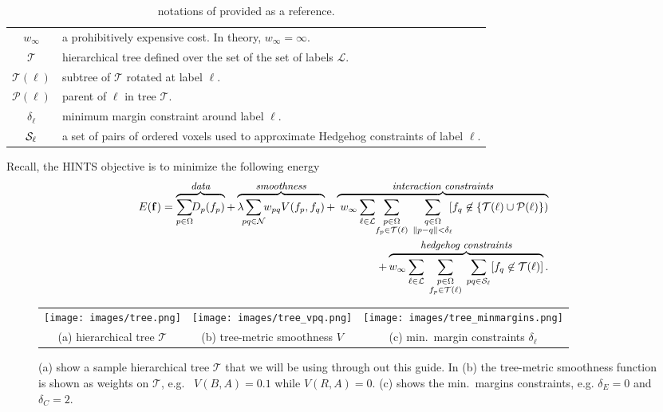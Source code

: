 \documentclass[12pt,letterpaper]{article}
\def\Tree{\mathcal{T}}
\def\labelvars{\mathbf{f}}
\def\labelvar{f}
\def\pixelset{\Omega}
\def\neighbset{\mathcal{N}}
\def\labelset{\mathcal{L}}
\def\Tree{\mathcal{T}}
\def\margins{\delta}
\def\unary{D}
\def\parent{\mathcal{P}}
\def\pairwise{V}
\begin{document}
\begin{table}[h]
\begin{tabular}{|c|p{14.5cm}|}
$w_\infty$ & a prohibitively expensive cost. In theory, $w_\infty=\infty$.\\
$\Tree$ & hierarchical tree defined over the set of the set of labels $\labelset.$\\
$\Tree(\ell)$ & subtree of $\Tree$ rotated at label $\ell$.\\
$\parent(\ell)$ & parent of $\ell$ in tree $\Tree$.\\
$\margins_\ell$ & minimum margin constraint around label $\ell$.\\
${\cal S}_\ell$ & a set of pairs of ordered voxels used to approximate Hedgehog constraints of label $\ell$.\\
\hline
\end{tabular}
\caption{notations of \cite{hedgehogIsack,pathmovesIsack} provided as a reference.}
\label{tb:notation}
\end{table}

Recall, the HINTS objective \cite{pathmovesIsack} is to minimize the following energy
\begin{equation} \label{eqn:OurMainEnergy}
\begin{split}
\!\!\!\!\!\!E(\labelvars)= \overbrace{\sum_{p \in \pixelset} \!\!\unary_p(\labelvar_p)}^\text{\small {\em data}} + \overbrace{\lambda\!\!\sum_{pq \in \neighbset}\!\!w_{pq}V(\labelvar_p,\labelvar_q)}^\text{\small {\em smoothness}} + \overbrace{\phantom{\sum}\!\!\!\!\!\!\!w_\infty
\sum_{\mathclap{\substack{\ell \in \labelset}}} \;\;
\sum_{\mathclap{\substack{p\in\pixelset \\ \labelvar_p \in \Tree(\ell)} }}
\quad\sum_{\substack{ q\in\pixelset\\ \lVert p-q\rVert < \margins_{\ell}}}\!\![\labelvar_q \not\in \{\Tree(\ell) \cup \parent(\ell)  \})}^\text{\small \em interaction constraints}\\
+ \overbrace{w_{\infty}\sum_{\ell \in \labelset}\quad \sum_{\mathclap{\substack{p \in \pixelset\\ \labelvar_p \in \Tree(\ell)}}}\quad \sum_{pq \in {\mathcal S}_{\ell}} [\labelvar_q \not \in \Tree(\ell)]}^\text{\small \em hedgehog constraints}.
\end{split}
\end{equation}

\newpage

\begin{figure}[t]
\centering
\begin{tabular}{ccc}
\texttt{[image: images/tree.png]}&
\texttt{[image: images/tree\_vpq.png]}&
\texttt{[image: images/tree\_minmargins.png]}\\[-1ex]
(a) hierarchical tree $\Tree$ & (b) tree-metric smoothness $\pairwise$  & (c) min.~margin constraints $\margins_\ell$
\end{tabular}
\caption{(a) show a sample hierarchical tree $\Tree$ that we will be using through out this guide. In (b) the tree-metric smoothness function is shown as weights on $\Tree$, e.g.~ $V(B,A)=0.1$ while $V(R,A)=0.$ (c) shows the min.~margins constraints, e.g. $\margins_E=0$ and $\margins_C=2.$}
\label{fig:bsceg}
\end{figure}
\end{document}
